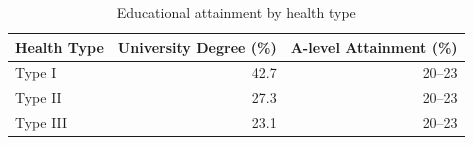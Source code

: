 \begin{table}[ht]
    \centering
    \caption{Educational attainment by health type}
    \label{tab:education}
    \begin{tabular}{lrr}
        \toprule
        Health Type & University Degree (\%) & A-level Attainment (\%) \\
        \midrule
        Type I & 42.7 & 20--23 \\
        Type II & 27.3 & 20--23 \\
        Type III & 23.1 & 20--23 \\
        \bottomrule
    \end{tabular}
\end{table}
